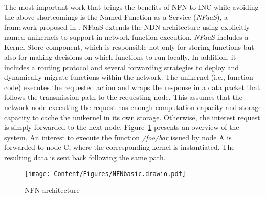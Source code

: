 The most important work that brings the benefits of NFN to INC while avoiding the above shortcomings is the Named Function as a Service (\textit{NFaaS}), a framework proposed in \cite{10.1145/3125719.3125727}. NFaaS extends the NDN architecture using explicitly named unikernels to support in-network function execution. 
\textit{NFaaS} includes a Kernel Store component, which is responsible not only for storing functions but also for making decisions on which functions to run locally. In addition, it includes a routing protocol and several forwarding strategies to deploy and dynamically migrate functions within the network. 
The unikernel (i.e., function code) executes the requested action and wraps the response in a data packet that follows the transmission path to the requesting node. This assumes that the network node executing the request has enough computation capacity and storage capacity to cache the unikernel in its own storage. Otherwise, the interest request is simply forwarded to the next node. Figure~\ref{fig:NFNarchitecture} presents an overview of the system. An interest to execute the function \textit{/foo/bar} issued by node A is forwarded to node C, where the corresponding kernel is instantiated. The resulting data is sent back following the same path.
 
\begin{figure}
\centering
\texttt{[image: Content/Figures/NFNbasic.drawio.pdf]}
\caption{NFN architecture}
\label{fig:NFNarchitecture}
\end{figure}

